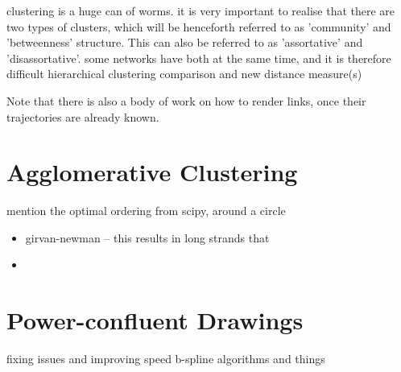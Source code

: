 clustering is a huge can of worms.
it is very important to realise that there are two types of clusters, which will be henceforth referred to as 'community' and 'betweenness' structure. This can also be referred to as 'assortative' and 'disassortative'.
some networks have both at the same time, and it is therefore difficult 
hierarchical clustering comparison and new distance measure(s)

Note that there is also a body of work on how to render links, once their trajectories are already known.

\section{Agglomerative Clustering}

mention the optimal ordering from scipy, around a circle

\begin{itemize}
    \item girvan-newman -- this results in long strands that \item
\end{itemize}

\section{Power-confluent Drawings}
fixing issues and improving speed
b-spline algorithms and things